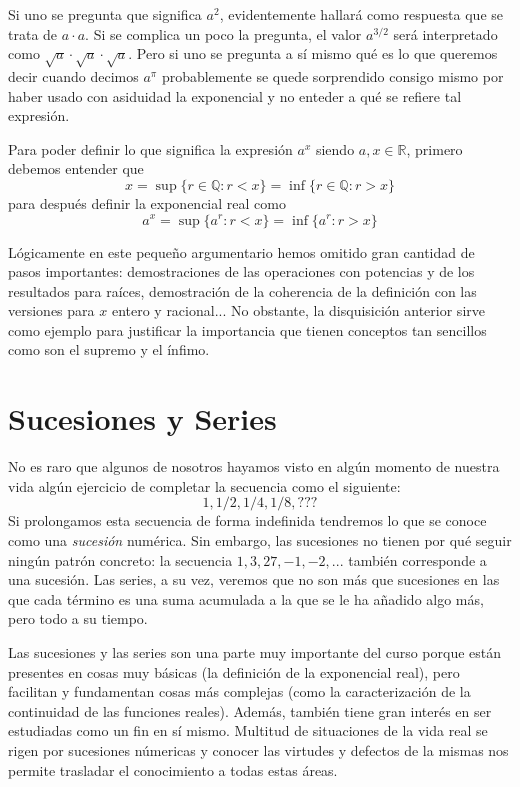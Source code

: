 \documentclass[10pt,a4paper,openright]{book}
\theoremstyle{break}
\begin{document}
Si uno se pregunta que significa $a^2$, evidentemente hallará como respuesta que se trata de $a\cdot a$. Si se complica un poco la pregunta, el valor $a^{3/2}$ será interpretado como $\sqrt{a} \cdot \sqrt{a} \cdot \sqrt{a}$. Pero si uno se pregunta a sí mismo qué es lo que queremos decir cuando decimos $a^\pi$ probablemente se quede sorprendido consigo mismo por haber usado con asiduidad la exponencial y no enteder a qué se refiere tal expresión.

Para poder definir lo que significa la expresión $a^x$ siendo $a,x\in \mathbb R$, primero debemos entender que
\[
x=\sup\{r\in \mathbb Q: r<x\}=\inf\{r\in \mathbb Q: r>x\}
\]
para después definir la exponencial real como 
\[
a^x=\sup\{a^r: r<x\}=\inf\{a^r: r>x\}
\]

Lógicamente en este pequeño argumentario hemos omitido gran cantidad de pasos importantes: demostraciones de las operaciones con potencias y de los resultados para raíces, demostración de la coherencia de la definición con las versiones para $x$ entero y racional... No obstante, la disquisición anterior sirve como ejemplo para justificar la importancia que tienen conceptos tan sencillos como son el supremo y el ínfimo.

\chapter{Sucesiones y Series}
No es raro que algunos de nosotros hayamos visto en algún momento de nuestra vida algún ejercicio de completar la secuencia como el siguiente:
\[
1, 1/2, 1/4, 1/8, ???
\]
Si prolongamos esta secuencia de forma indefinida tendremos lo que se conoce como una \textit{sucesión} numérica. Sin embargo, las sucesiones no tienen por qué seguir ningún patrón concreto: la secuencia $1, 3, 27, -1, -2, ...$ también corresponde a una sucesión. Las series, a su vez, veremos que no son más que sucesiones en las que cada término es una suma acumulada a la que se le ha añadido algo más, pero todo a su tiempo.

Las sucesiones y las series son una parte muy importante del curso porque están presentes en cosas muy básicas (la definición de la exponencial real), pero facilitan y fundamentan cosas más complejas (como la caracterización de la continuidad de las funciones reales). Además, también tiene gran interés en ser estudiadas como un fin en sí mismo. Multitud de situaciones de la vida real se rigen por sucesiones númericas y conocer las virtudes y defectos de la mismas nos permite trasladar el conocimiento a todas estas áreas.
\end{document}
